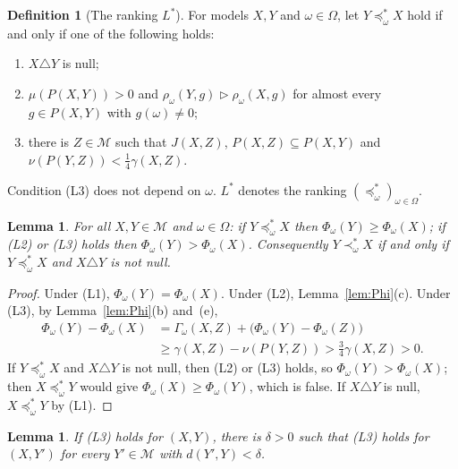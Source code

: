 \documentclass[11pt]{article}
\newtheorem{lemma}[theorem]{Lemma}
\theoremstyle{definition}
\newtheorem{definition}[theorem]{Definition}
\newcommand{\M}{\mathcal M}
\begin{document}
\begin{definition}[The ranking $L^\ast$]\label{def:R}
For models $X,Y$ and $\omega\in\Omega$, let $Y\preceq^\ast_\omega X$ hold if and only if one of the following holds:
\begin{enumerate}[label=(L\arabic*)]
\item $X\triangle Y$ is null;
\item $\mu(P(X,Y))>0$ and $\rho_\omega(Y,g)\rhd\rho_\omega(X,g)$ for almost every $g\in P(X,Y)$ with $g(\omega)\ne0$;
\item there is $Z\in\M$ such that $J(X,Z)$, $P(X,Z)\subseteq P(X,Y)$ and $\nu(P(Y,Z))<\frac14\gamma(X,Z)$.
\end{enumerate}
Condition (L3) does not depend on $\omega$. $L^\ast$ denotes the ranking $(\preceq^\ast_\omega)_{\omega\in\Omega}$.
\end{definition}

\begin{lemma}\label{lem:monotone}
For all $X,Y\in\M$ and $\omega\in\Omega$: if $Y\preceq^\ast_\omega X$ then $\Phi_\omega(Y)\ge\Phi_\omega(X)$; if (L2) or (L3) holds then $\Phi_\omega(Y)>\Phi_\omega(X)$. Consequently $Y\prec^\ast_\omega X$ if and only if $Y\preceq^\ast_\omega X$ and $X\triangle Y$ is not null.
\end{lemma}
\begin{proof}
Under (L1), $\Phi_\omega(Y)=\Phi_\omega(X)$. Under (L2), Lemma~\ref{lem:Phi}(c). Under (L3), by Lemma~\ref{lem:Phi}(b) and~(e),
\begin{align*}
\Phi_\omega(Y)-\Phi_\omega(X)&=\Gamma_\omega(X,Z)+\bigl(\Phi_\omega(Y)-\Phi_\omega(Z)\bigr)\\
&\ge\gamma(X,Z)-\nu(P(Y,Z))>\tfrac34\gamma(X,Z)>0.
\end{align*}
If $Y\preceq^\ast_\omega X$ and $X\triangle Y$ is not null, then (L2) or (L3) holds, so $\Phi_\omega(Y)>\Phi_\omega(X)$; then $X\preceq^\ast_\omega Y$ would give $\Phi_\omega(X)\ge\Phi_\omega(Y)$, which is false. If $X\triangle Y$ is null, $X\preceq^\ast_\omega Y$ by (L1).
\end{proof}

\begin{lemma}\label{lem:uniform}
If (L3) holds for $(X,Y)$, there is $\delta>0$ such that (L3) holds for $(X,Y')$ for every $Y'\in\M$ with $d(Y',Y)<\delta$.
\end{lemma}
\end{document}
